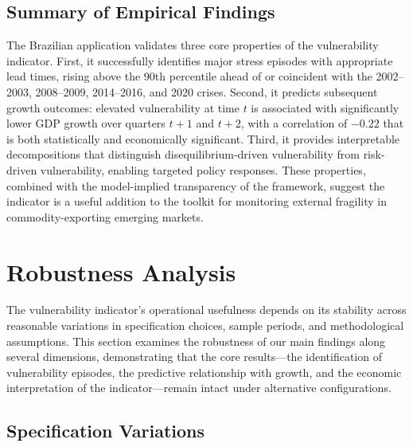 \documentclass[12pt,a4paper]{article}
\numberwithin{equation}{section}
\theoremstyle{definition}
\theoremstyle{remark}
\begin{document}
\subsection{Summary of Empirical Findings}

The Brazilian application validates three core properties of the vulnerability indicator. First, it successfully identifies major stress episodes with appropriate lead times, rising above the 90th percentile ahead of or coincident with the 2002--2003, 2008--2009, 2014--2016, and 2020 crises. Second, it predicts subsequent growth outcomes: elevated vulnerability at time $t$ is associated with significantly lower GDP growth over quarters $t+1$ and $t+2$, with a correlation of $-0.22$ that is both statistically and economically significant. Third, it provides interpretable decompositions that distinguish disequilibrium-driven vulnerability from risk-driven vulnerability, enabling targeted policy responses. These properties, combined with the model-implied transparency of the framework, suggest the indicator is a useful addition to the toolkit for monitoring external fragility in commodity-exporting emerging markets.


\section{Robustness Analysis}
\label{sec:robustness}

The vulnerability indicator's operational usefulness depends on its stability across reasonable variations in specification choices, sample periods, and methodological assumptions. This section examines the robustness of our main findings along several dimensions, demonstrating that the core results---the identification of vulnerability episodes, the predictive relationship with growth, and the economic interpretation of the indicator---remain intact under alternative configurations.


\subsection{Specification Variations}
\end{document}
